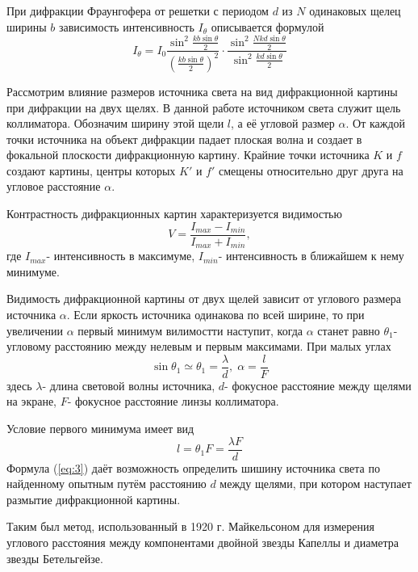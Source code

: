 При дифракции Фраунгофера от решетки с периодом $d$ из $N$ одинаковых щелец ширины $b$ зависимость интенсивность $I_{\theta}$ описывается формулой
\begin{equation}
	I_{\theta}=I_0\frac{\sin^2\frac{kb\sin\theta}{2}}{(\frac{kb\sin\theta}{2})^2}
	\cdot
	\frac{\sin^2\frac{Nkd\sin{\theta}}{2}}{\sin^2\frac{kd\sin{\theta}}{2}}	
\end{equation}

Рассмотрим влияние размеров источника света на вид дифракционной картины при дифракции на двух щелях. В данной работе источником света служит щель коллиматора. Обозначим ширину этой щели $l$, а её угловой размер $\alpha$. %
От каждой точки источника на объект дифракции падает плоская волна и создает в фокальной плоскости дифракционную картину. Крайние точки источника $K$ и $f$ создают картины, центры которых $K'$ и $f'$ смещены относительно друг друга на угловое расстояние $\alpha$. %

Контрастность дифракционных картин характеризуется видимостью
\begin{equation}
	V=\frac{I_{max}-I_{min}}{I_{max}+I_{min}},
\end{equation}
где $I_{max}$- интенсивность в максимуме, $I_{min}$- интенсивность в ближайшем к нему минимуме.

Видимость дифракционной картины от двух щелей зависит от углового размера источника $\alpha$. Если яркость источника одинакова по всей ширине, то при увеличении $\alpha$ первый минимум вилимостти наступит, когда $\alpha$ станет равно $\theta_1$- угловому расстоянию между нелевым и первым максимами. При малых углах
\begin{equation}
	\sin{\theta_1}\simeq\theta_1=\frac{\lambda}{d},\; \alpha=\frac{l}{F}
\end{equation}
здесь $\lambda$- длина световой волны источника, $d$- фокусное расстояние между щелями на экране, $F$- фокусное расстояние линзы коллиматора.

Условие первого минимума имеет вид
\begin{equation}
	\label{eq:3}
	l=\theta_1F=\frac{\lambda F}{d}
\end{equation}
Формула (\ref{eq:3}) даёт возможность определить шишину источника света по найденному опытным путём расстоянию $d$ между щелями, при котором наступает размытие дифракционной картины.

Таким был метод, использованный в 1920 г. Майкельсоном для измерения углового расстояния между компонентами двойной звезды Капеллы и диаметра звезды Бетельгейзе.

